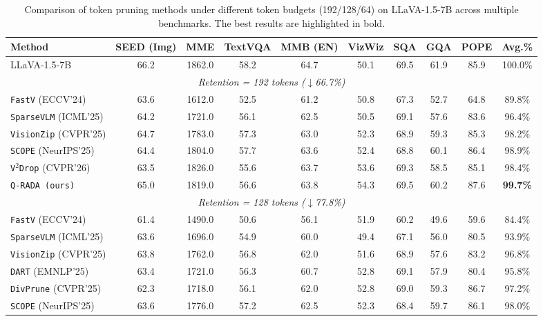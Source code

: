 \begin{table}[t]
\centering
\small
\setlength{\tabcolsep}{5.5pt}
\caption{Comparison of token pruning methods under different token budgets (192/128/64) on LLaVA-1.5-7B across multiple benchmarks. The best results are highlighted in bold.}
\label{tab:results-7b}
\begin{tabular}{l|cccccccc|c}
\toprule
\textbf{Method} & SEED (Img) & MME & TextVQA & MMB (EN) & VizWiz & SQA & GQA & POPE & \textbf{Avg.\%} \\
\midrule
LLaVA-1.5-7B  & 66.2 & 1862.0 & 58.2 & 64.7 & 50.1 & 69.5 & 61.9 & 85.9 & 100.0\% \\
\midrule
\multicolumn{10}{c}{\textit{Retention = 192 tokens ($\downarrow$66.7\%)}} \\
\midrule
\texttt{FastV} (ECCV'24) & 63.6 & 1612.0 & 52.5 & 61.2 & 50.8 & 67.3 & 52.7 & 64.8 & 89.8\% \\
\texttt{SparseVLM} (ICML'25) & 64.2 & 1721.0 & 56.1 & 62.5 & 50.5 & 69.1 & 57.6 & 83.6 & 96.4\% \\
\texttt{VisionZip} (CVPR'25) & 64.7 & 1783.0 & 57.3 & 63.0 & 52.3 & 68.9 & 59.3 & 85.3 & 98.2\% \\
\texttt{SCOPE} (NeurIPS'25) & 64.4 & 1804.0 & 57.7 & 63.6 & 52.4 & 68.8 & 60.1 & 86.4 & 98.9\% \\
\texttt{V$^2$Drop} (CVPR'26) & 63.5 & 1826.0 & 55.6 & 63.7 & 53.6 & 69.3 & 58.5 & 85.1 & 98.4\% \\
\rowcolor{gray!20} \texttt{Q-RADA (ours)} & 65.0 & 1819.0 & 56.6 & 63.8 & 54.3 & 69.5 & 60.2 & 87.6 & \textbf{99.7\%} \\
\midrule
\multicolumn{10}{c}{\textit{Retention = 128 tokens ($\downarrow$77.8\%)}} \\
\midrule
\texttt{FastV} (ECCV'24) & 61.4 & 1490.0 & 50.6 & 56.1 & 51.9 & 60.2 & 49.6 & 59.6 & 84.4\% \\
\texttt{SparseVLM} (ICML'25) & 63.6 & 1696.0 & 54.9 & 60.0 & 49.4 & 67.1 & 56.0 & 80.5 & 93.9\% \\
\texttt{VisionZip} (CVPR'25) & 63.8 & 1762.0 & 56.8 & 62.0 & 51.6 & 68.9 & 57.6 & 83.2 & 96.8\% \\
\texttt{DART} (EMNLP'25) & 63.4 & 1721.0 & 56.3 & 60.7 & 52.8 & 69.1 & 57.9 & 80.4 & 95.8\% \\
\texttt{DivPrune} (CVPR'25) & 62.3 & 1718.0 & 56.1 & 62.0 & 52.8 & 69.0 & 59.3 & 86.7 & 97.2\% \\
\texttt{SCOPE} (NeurIPS'25) & 63.6 & 1776.0 & 57.2 & 62.5 & 52.3 & 68.4 & 59.7 & 86.1 & 98.0\% \\

\end{tabular}
\end{table}
